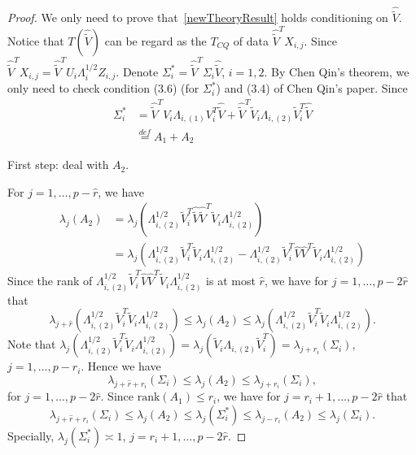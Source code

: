 \begin{proof}
    We only need to prove that~\eqref{newTheoryResult} holds conditioning on $\hat{\tilde{V}}$.
    Notice that $T(\hat{\tilde{V}})$ can be regard as the $T_{CQ}$ of data $\hat{\tilde{V}}^T X_{i,j}$.
    Since $\hat{\tilde{V}}^T X_{i,j}=\hat{\tilde{V}}^T U_i\Lambda^{1/2}_{i}Z_{i,j}$. Denote $\Sigma_i^*=\hat{\tilde{V}}^T\Sigma_i\hat{\tilde{V}}$, $i=1,2$.
    By Chen Qin's theorem, we only need to check condition (3.6) (for $\Sigma_i^*$) and (3.4) of Chen Qin's paper.
    Since 
    \begin{equation}
        \begin{aligned}
            \Sigma_i^*&=\hat{\tilde{V}}^T V_i \Lambda_{i,(1)}V_i^T \hat{\tilde{V}}+
    \hat{\tilde{V}}^T \tilde{V}_i \Lambda_{i,(2)}\tilde{V}_i^T\hat{\tilde{V}}\\
            &\overset{def}{=}A_1+A_2
        \end{aligned}
    \end{equation}

First step: deal with $A_2$.

     For $j=1,\ldots,p-\hat{r}$, we have 
    \begin{equation} 
        \begin{aligned}
            \lambda_j(A_2)&=
        \lambda_j(\Lambda_{i,(2)}^{1/2}\tilde{V}_i^T\hat{\tilde{V}}\hat{\tilde{V}}^T \tilde{V}_i\Lambda_{i,(2)}^{1/2})
           \\ 
            &=\lambda_j(\Lambda_{i,(2)}^{1/2}\tilde{V}_i^T \tilde{V}_i\Lambda_{i,(2)}^{1/2}-\Lambda_{i,(2)}^{1/2}\tilde{V}_i^T \hat{V}\hat{V}^T\tilde{V}_i\Lambda_{i,(2)}^{1/2})
        \end{aligned}
    \end{equation}
    Since the rank of $\Lambda_{i,(2)}^{1/2}\tilde{V}_i^T \hat{V}\hat{V}^T\tilde{V}_i\Lambda_{i,(2)}^{1/2}$ is at most $\hat{r}$, we have for $j=1,\ldots,p-2\hat{r}$ that 
    \begin{equation}
        \lambda_{j+\hat{r}}(\Lambda_{i,(2)}^{1/2}\tilde{V}_i^T \tilde{V}_i\Lambda_{i,(2)}^{1/2})
            \leq\lambda_j(A_2)\leq
            \lambda_j(\Lambda_{i,(2)}^{1/2}\tilde{V}_i^T \tilde{V}_i\Lambda_{i,(2)}^{1/2}).
    \end{equation}
    Note that $\lambda_j(\Lambda_{i,(2)}^{1/2}\tilde{V}_i^T \tilde{V}_i\Lambda_{i,(2)}^{1/2})=\lambda_j( \tilde{V}_i\Lambda_{i,(2)}\tilde{V}_i^T)=\lambda_{j+r_i}(\Sigma_i)$,
    $j=1,\ldots,p-r_i$. Hence we have
    \begin{equation}
        \lambda_{j+\hat{r}+r_i}(\Sigma_i)\leq \lambda_j(A_2)\leq \lambda_{j+r_i}(\Sigma_i),
    \end{equation}
    for $j=1,\ldots,p-2\hat{r}$.
Since $\mathrm{rank}(A_1)\leq r_i$, we have for $j=r_i+1,\ldots,p-2\hat{r}$ that
    \begin{equation}\label{mainLimitTheoremIne1}
        \lambda_{j+\hat{r}+r_i}(\Sigma_i)\leq \lambda_j(A_2)\leq\lambda_j(\Sigma_i^*)\leq \lambda_{j-r_i}(A_2)\leq \lambda_j(\Sigma_i).
    \end{equation}
    Specially, $\lambda_j(\Sigma_i^*)\asymp 1$, $j=r_i+1,\ldots,p-2\hat{r}$.


\end{proof}
